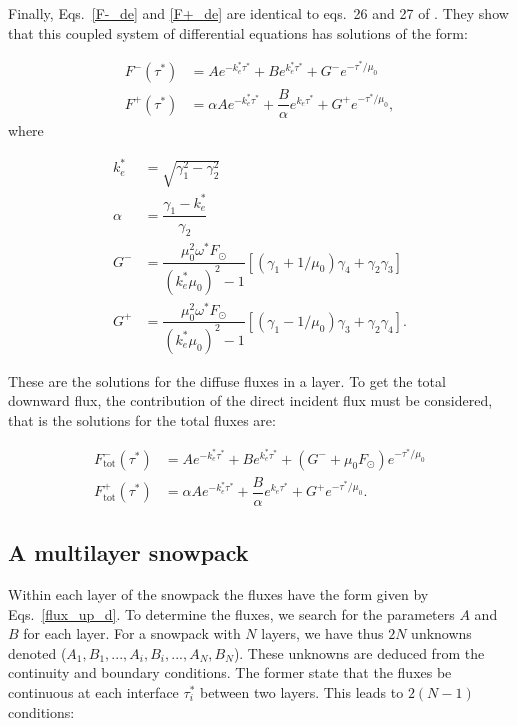 \documentclass[a4paper,11pt]{article}
\begin{document}
Finally, Eqs.~\ref{F-_de} and \ref{F+_de} are identical to eqs.~26 and 27 of \cite{jimenez-aquino_two_2005}. They show that this coupled system of differential equations has solutions of the form:


\begin{align}
F^{-}(\tau^*)&=A e^{-k_e^* \tau^*}+B e^{k_e^* \tau^*}+G^{-}e^{-\tau^*/\mu_0} \\
F^{+}(\tau^*)&=\alpha A e^{-k_e^* \tau^*}+\dfrac{B}{\alpha} e^{k_e \tau^*}+G^{+}e^{-\tau^* /\mu_0},
\end{align}
where 

\begin{align}
k_e^* & =\sqrt{\gamma_1^2-\gamma_2^2} \\
\alpha & =\dfrac{\gamma_1-k_e^*}{\gamma_2} \\
G^{-}&=\dfrac{\mu_0^2 \omega^* F_\odot}{(k_e^* \mu_0)^2-1}\left[(\gamma_1+1/\mu_0)\gamma_4 +\gamma_2 \gamma_3\right] \\
G^{+}&=\dfrac{\mu_0^2 \omega^* F_\odot}{(k_e^* \mu_0)^2-1}\left[(\gamma_1-1/\mu_0)\gamma_3 +\gamma_2 \gamma_4\right].
\end{align}

These are the solutions for the diffuse fluxes in a layer. To get the total downward flux, the contribution of the direct incident flux must be considered, that is the solutions for the total fluxes are:

\begin{subequations}
\begin{align}
F^{-}_{\textrm{tot}}(\tau^*)&=A e^{-k_e^* \tau^*}+B e^{k_e^* \tau^*}+ (G^{-} + \mu_0 F_\odot)e^{-\tau^*/\mu_0} \label{single1}\\
F^{+}_{\textrm{tot}}(\tau^*)&=\alpha A e^{-k_e^* \tau^*}+\dfrac{B}{\alpha} e^{k_e \tau^*}+G^{+}e^{-\tau^* /\mu_0}.
\label{single2}
\end{align}
\label{flux_up_d}
\end{subequations}


\subsection{A multilayer snowpack}

Within each layer of the snowpack the fluxes have the form given by Eqs.~\ref{flux_up_d}. To determine the fluxes, we search for the parameters $A$ and $B$ for each layer. For a snowpack with $N$ layers, we have thus $2N$ unknowns denoted ($A_1,B_1,...,A_i,B_i,...,A_N,B_N$). These unknowns are deduced from the continuity and boundary conditions. The former state that the fluxes be continuous at each interface $\tau_i^*$ between two layers. This leads to $2(N-1)$ conditions:
\end{document}
